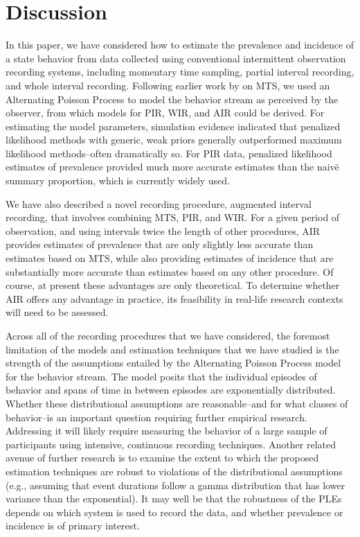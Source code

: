 \documentclass[man, noextraspace, floatsintext]{apa6}\usepackage[]{graphicx}\usepackage[]{color}
\begin{document}
\section{Discussion}
\label{sec:discussion}

In this paper, we have considered how to estimate the prevalence and incidence of a state behavior from data collected using conventional intermittent observation recording systems, including momentary time sampling, partial interval recording, and whole interval recording. Following earlier work by \citet{Brown1977estimation} on MTS, we used an Alternating Poisson Process to model the behavior stream as perceived by the observer, from which models for PIR, WIR, and AIR could be derived. For estimating the model parameters, simulation evidence indicated that penalized likelihood methods with generic, weak priors generally outperformed maximum likelihood methods--often dramatically so. For PIR data, penalized likelihood estimates of prevalence provided much more accurate estimates than the naiv\"e summary proportion, which is currently widely used.

We have also described a novel recording procedure, augmented interval recording, that involves combining MTS, PIR, and WIR. For a given period of observation, and using intervals twice the length of other procedures, AIR provides estimates of prevalence that are only slightly less accurate than estimates based on MTS, while also providing estimates of incidence that are substantially more accurate than estimates based on any other procedure. Of course, at present these advantages are only theoretical. To determine whether AIR offers any advantage in practice, its feasibility in real-life research contexts will need to be assessed.  

Across all of the recording procedures that we have considered, the foremost limitation of the models and estimation techniques that we have studied is the strength of the assumptions entailed by the Alternating Poisson Process model for the behavior stream. The model posits that the individual episodes of behavior and spans of time in between episodes are exponentially distributed. Whether these distributional assumptions are reasonable--and for what classes of behavior--is an important question requiring further empirical research. Addressing it will likely require measuring the behavior of a large sample of participants using intensive, continuous recording techniques. 
Another related avenue of further research is to examine the extent to which the proposed estimation techniques are robust to violations of the distributional assumptions (e.g., assuming that event durations follow a gamma distribution that has lower variance than the exponential). It may well be that the robustness of the PLEs depends on which system is used to record the data, and whether prevalence or incidence is of primary interest.
\end{document}
